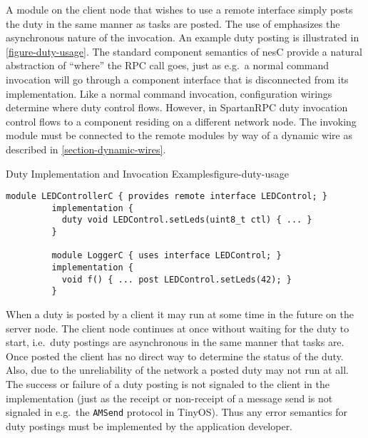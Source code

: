 A module on the client node that wishes to use a remote interface
simply posts the duty in the same manner as tasks are posted. The use
of  emphasizes the asynchronous nature of the
invocation. An example duty posting is illustrated in
\autoref{figure-duty-usage}. The standard component semantics of nesC
provide a natural abstraction of ``where'' the RPC call goes, just as
e.g.~a normal command invocation will go through a component interface
that is disconnected from its implementation. Like a normal command
invocation, configuration wirings determine where duty control
flows. However, in SpartanRPC duty invocation control flows to a
component residing on a different network node. The invoking module
must be connected to the remote modules by way of a dynamic wire as
described in \autoref{section-dynamic-wires}.

\begin{fpfig}[t]{Duty Implementation and Invocation Examples}{figure-duty-usage}
{
\begin{center}
\vspace{0.5em}
\begin{Verbatim}[fontsize=\small]
         module LEDControllerC { provides remote interface LEDControl; }
         implementation {
           duty void LEDControl.setLeds(uint8_t ctl) { ... }
         } 
 
         module LoggerC { uses interface LEDControl; }
         implementation {
           void f() { ... post LEDControl.setLeds(42); }
         }
\end{Verbatim}
\vspace{0.1em}
\end{center}
}
\end{fpfig}

When a duty is posted by a client it may run at some time in the
future on the server node. The client node continues at once without
waiting for the duty to start, i.e.~duty postings are asynchronous in
the same manner that tasks are. Once posted the client has no direct
way to determine the status of the duty. Also, due to the
unreliability of the network a posted duty may not run at all. The
success or failure of a duty posting is not signaled to the client in
the implementation (just as the receipt or non-receipt of a message
send is not signaled in e.g.~the \texttt{AMSend} protocol in
TinyOS). Thus any error semantics for duty postings must be
implemented by the application developer.

